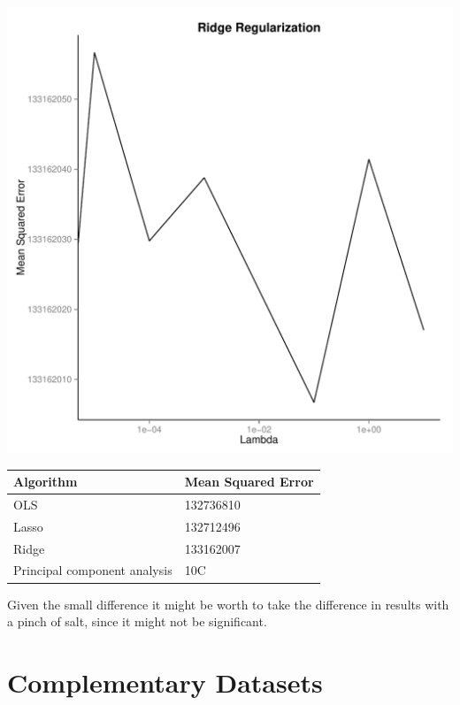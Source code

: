 \documentclass[conference]{IEEEtran}\usepackage[]{graphicx}\usepackage[]{color}
\makeatletter
\def\maxwidth{ %
  \ifdim\Gin@nat@width>\linewidth
    \linewidth
  \else
    \Gin@nat@width
  \fi
}
\newenvironment{knitrout}{}{} %
\makeatother
\begin{document}
\begin{knitrout}
\color{fgcolor}
\includegraphics[width=\maxwidth]{figure/unnamed-chunk-3-1} 

\end{knitrout}


\begin{center}
    \begin{tabular}{| l | l |}
    \hline
    \textbf{Algorithm} & \textbf{Mean Squared Error}  \\ \hline
    OLS & 132736810 \\ \hline
    Lasso & 132712496  \\ \hline
    Ridge & 133162007  \\ \hline
    Principal component analysis & 10C  \\ \hline
    \end{tabular}
\end{center}

Given the small difference it might be worth to take the difference in results
with a pinch of salt, since it might not be significant.

\section{Complementary Datasets}
\end{document}
